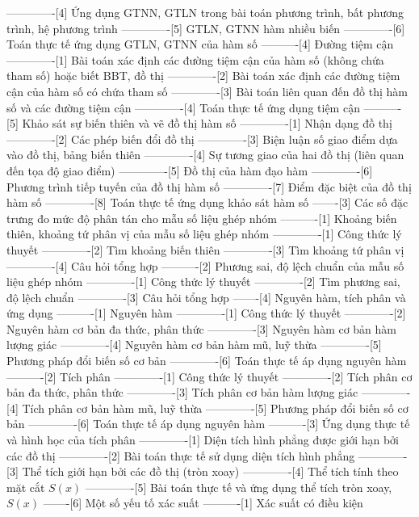 -------------[4] Ứng dụng GTNN, GTLN trong bài toán phương trình, bất phương trình, hệ phương trình
-------------[5] GTLN, GTNN hàm nhiều biến
-------------[6] Toán thực tế ứng dụng GTLN, GTNN của hàm số
----------[4] Đường tiệm cận
-------------[1] Bài toán xác định các đường tiệm cận của hàm số (không chứa tham số) hoặc biết BBT, đồ thị
-------------[2] Bài toán xác định các đường tiệm cận của hàm số có chứa tham số
-------------[3] Bài toán liên quan đến đồ thị hàm số và các đường tiệm cận
-------------[4] Toán thực tế ứng dụng tiệm cận
----------[5] Khảo sát sự biến thiên và vẽ đồ thị hàm số
-------------[1] Nhận dạng đồ thị
-------------[2] Các phép biến đổi đồ thị
-------------[3] Biện luận số giao điểm dựa vào đồ thị, bảng biến thiên
-------------[4] Sự tương giao của hai đồ thị (liên quan đến tọa độ giao điểm)
-------------[5] Đồ thị của hàm đạo hàm
-------------[6] Phương trình tiếp tuyến của đồ thị hàm số
-------------[7] Điểm đặc biệt của đồ thị hàm số
-------------[8] Toán thực tế ứng dụng khảo sát hàm số
-------[3] Các số đặc trưng đo mức độ phân tán cho mẫu số liệu ghép nhóm
----------[1] Khoảng biến thiên, khoảng tứ phân vị của mẫu số liệu ghép nhóm
-------------[1] Công thức lý thuyết
-------------[2] Tìm khoảng biến thiên
-------------[3] Tìm khoảng tứ phân vị
-------------[4] Câu hỏi tổng hợp
----------[2] Phương sai, độ lệch chuẩn của mẫu số liệu ghép nhóm
-------------[1] Công thức lý thuyết
-------------[2] Tìm phương sai, độ lệch chuẩn
-------------[3] Câu hỏi tổng hợp
-------[4] Nguyên hàm, tích phân và ứng dụng
----------[1] Nguyên hàm
-------------[1] Công thức lý thuyết
-------------[2] Nguyên hàm cơ bản đa thức, phân thức
-------------[3] Nguyên hàm cơ bản hàm lượng giác
-------------[4] Nguyên hàm cơ bản hàm mũ, luỹ thừa
-------------[5] Phương pháp đổi biến số cơ bản
-------------[6] Toán thực tế áp dụng nguyên hàm
----------[2] Tích phân
-------------[1] Công thức lý thuyết
-------------[2] Tích phân cơ bản đa thức, phân thức
-------------[3] Tích phân cơ bản hàm lượng giác
-------------[4] Tích phân cơ bản hàm mũ, luỹ thừa
-------------[5] Phương pháp đổi biến số cơ bản
-------------[6] Toán thực tế áp dụng nguyên hàm
----------[3] Ứng dụng thực tế và hình học của tích phân
-------------[1] Diện tích hình phẳng được giới hạn bởi các đồ thị
-------------[2] Bài toán thực tế sử dụng diện tích hình phẳng
-------------[3] Thể tích giới hạn bởi các đồ thị (tròn xoay)
-------------[4] Thể tích tính theo mặt cắt $S(x)$
-------------[5] Bài toán thực tế và ứng dụng thể tích tròn xoay, $S(x)$
-------[6] Một số yếu tố xác suất
----------[1] Xác suất có điều kiện
